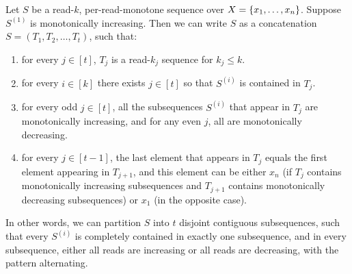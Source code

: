 \documentclass[11pt]{article}
\begin{document}
\begin{lemma}
\label{lem:k-reg-interleave-concat}
Let $S$ be a read-$k$, per-read-monotone sequence over $X=\left\{ x_1, \ldots, x_n \right\}$. Suppose $S^{(1)}$ is monotonically increasing. Then we can write $S$ as a concatenation
$S = (T_1 , T_2 , \ldots , T_t)$, such that:
\begin{enumerate}
\item for every $j \in [t]$, $T_j$ is a read-$k_j$ sequence for $k_j \le k$.
\item for every $i \in [k]$ there exists $j \in [t]$ so that $S^{(i)}$ is contained in $T_j$.
\item for every odd $j \in [t]$, all the subsequences $S^{(i)}$ that appear in $T_j$ are monotonically increasing, and for any even $j$, all are monotonically decreasing.
\item \label{item:border} for every $j \in [t-1]$, the last element that appears in $T_j$ equals the first element appearing in $T_{j+1}$, and this element can be either $x_n$ (if $T_j$ contains monotonically increasing subsequences and $T_{j+1}$ contains monotonically decreasing subsequences) or $x_1$ (in the opposite case). 
\end{enumerate}
In other words, we can partition $S$ into $t$ disjoint contiguous subsequences, such that every $S^{(i)}$ is completely contained in exactly one subsequence, and in every subsequence, either all reads are increasing or all reads are decreasing, with the pattern alternating.
\end{lemma}
\end{document}
